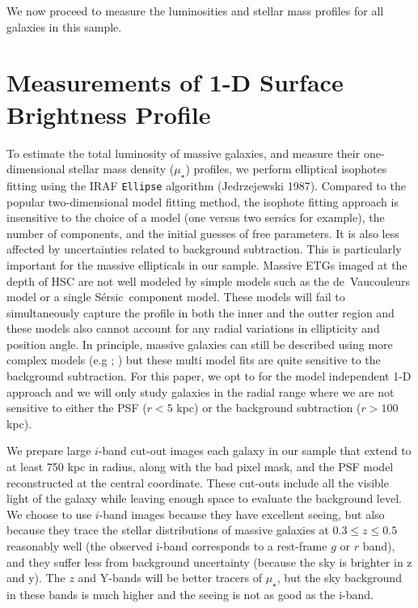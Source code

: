 \documentclass{emulateapj}
\def\ser{{S\'{e}rsic\ }}
\def\mden{{$\mu_{\star}$}}
\begin{document}
\begin{CJK*}{UTF8}{gbsn}
We now proceed to measure the luminosities and stellar mass profiles for all galaxies in this sample.
    


\section{Measurements of 1-D Surface Brightness Profile}
    \label{sec:ellipse}
    
    To estimate the total luminosity of massive galaxies, and measure their 
    one-dimensional stellar mass density (\mden{}) profiles, we perform elliptical 
    isophotes fitting using the IRAF \texttt{Ellipse} algorithm (Jedrzejewski 1987).  
    Compared to the popular two-dimensional model fitting method, the isophote fitting
    approach is insensitive to the choice of a model (one versus two sersics for example), the number of components, 
    and the initial guesses of free parameters. It is also less affected by uncertainties related to background subtraction. This is particularly important for the massive ellipticals in our sample. Massive ETGs imaged at the depth of HSC are not well modeled by simple models such as the de~Vaucouleurs model or a single \ser component model. These models will fail to simultaneously capture the profile in both the inner and the outter region and these models also cannot account for any radial variations in ellipticity and position angle. In principle, massive galaxies can still be described using more complex 
    models (e.g \citealt{Huang2013a}; \citealt{Huang2013b}) but these multi model fits are quite sensitive to the background subtraction. For this paper, we opt to for the model independent 1-D approach and we will only study galaxies in the radial range where we are not sensitive to either the PSF ($r<5$ kpc) or the background subtraction ($r>100$ kpc). 
        
    We prepare large $i$-band cut-out images each galaxy in our sample that extend to at least 750 kpc in radius, along with the bad pixel mask, and the 
    PSF model reconstructed at the central coordinate. These cut-outs include all the visible light of the galaxy while leaving enough space to evaluate the background level. 
    We choose to use $i$-band images because they have excellent seeing, but also because they trace the stellar distributions of massive 
    galaxies at $0.3 \leq z \leq 0.5$ reasonably well (the observed i-band corresponds to a rest-frame $g$ or $r$ band), and they suffer less from background uncertainty (because the sky is brighter in z and y). The $z$ and Y-bands will be better tracers of \mden{}, but the sky background in these bands 
    is much higher and the seeing is not as good as the i-band. 
    

\end{CJK*}
\end{document}
